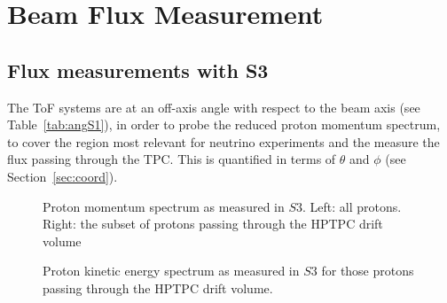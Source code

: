 \section{Beam Flux Measurement}
\label{hptpcPaper:sec:Results}

\subsection{Flux measurements with S3}

The ToF systems are at an off-axis angle with respect to the beam axis (see Table~\ref{tab:angS1}), in order to probe the reduced proton momentum spectrum, to cover the region most relevant for neutrino experiments and the measure the flux passing through the TPC.
This is quantified in terms of $\theta$ and $\phi$ (see Section~\ref{sec:coord}).

\begin{figure}[ht]
  \centering
  \begin{minipage}[t]{0.49\textwidth}
    \begin{adjustbox}{max totalsize={\textwidth}, center}
      
    \end{adjustbox}
  \end{minipage}
  \hfill
  \begin{minipage}[t]{0.49\textwidth}
    \begin{adjustbox}{max totalsize={\textwidth}, center}
      
    \end{adjustbox}
  \end{minipage}
  \caption{\label{fig:s3promom}Proton momentum spectrum as measured in $\mathit{S3}$. Left: all protons. Right: the subset of protons passing through the HPTPC drift volume}
\end{figure}

\begin{figure}[ht]
  \centering
  \begin{adjustbox}{max totalsize={0.5\textwidth}, center}
      
  \end{adjustbox}
  \caption{Proton kinetic energy spectrum as measured in $\mathit{S3}$ for those protons passing through the HPTPC drift volume.}
  \label{fig:tpcproke}
\end{figure}

